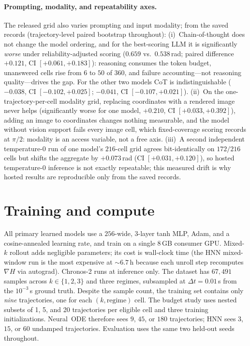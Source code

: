 \documentclass{article}
\begin{document}
\paragraph{Prompting, modality, and repeatability axes.}
\label{app:axes}
The released grid also varies prompting and input modality; from the saved records
(trajectory-level paired bootstrap throughout): (i)~Chain-of-thought does not change the
model ordering, and for the best-scoring LLM it is significantly \emph{worse} under
reliability-adjusted scoring ($0.659$ vs.\ $0.538$\,rad; paired difference $+0.121$, CI
$[+0.061,+0.183]$): reasoning consumes the token budget, unanswered cells rise from $6$ to
$50$ of $360$, and failure accounting---not reasoning quality---drives the gap. For the
other two models CoT is indistinguishable ($-0.038$, CI $[-0.102,+0.025]$; $-0.041$, CI
$[-0.107,+0.021]$). (ii)~On the one-trajectory-per-cell modality grid, replacing
coordinates with a rendered image never helps (significantly worse for one model, $+0.210$,
CI $[+0.033,+0.392]$), adding an image to coordinates changes nothing measurable, and the
model without vision support fails every image cell, which fixed-coverage scoring records
at $\pi/2$: modality is an access variable, not a free axis. (iii)~A second independent
temperature-$0$ run of one model's $216$-cell grid agrees bit-identically on $172/216$
cells but shifts the aggregate by $+0.073$\,rad (CI $[+0.031,+0.120]$), so hosted
temperature-$0$ inference is not exactly repeatable; this measured drift is why hosted
results are reproducible only from the saved records.

\section{Training and compute}
All primary learned models use a $256$-wide, $3$-layer tanh MLP, Adam, and a cosine-annealed
learning rate, and train on a single 8\,GB consumer GPU. Mixed-$k$ rollout adds negligible parameters;
its cost is wall-clock time (the HNN mixed-window run is the most expensive at ${\sim}6.7$\,h because
each unroll step recomputes $\nabla H$ via autograd). Chronos-2 runs at inference only. The
dataset has $67{,}491$ samples across $k\in\{1,2,3\}$ and three regimes, subsampled at
$\Delta t{=}0.01$\,s from the $10^{-3}$\,s ground truth. Despite the sample count, the
training set contains only \emph{nine} trajectories, one for each $(k,\mathrm{regime})$ cell. The
budget study uses nested subsets of 1, 5, and 20 trajectories per eligible cell and three
training initializations. Neural~ODE therefore sees $9$, $45$, or $180$ trajectories; HNN sees $3$,
$15$, or $60$ undamped trajectories. Evaluation uses the same two held-out seeds throughout.
\end{document}

